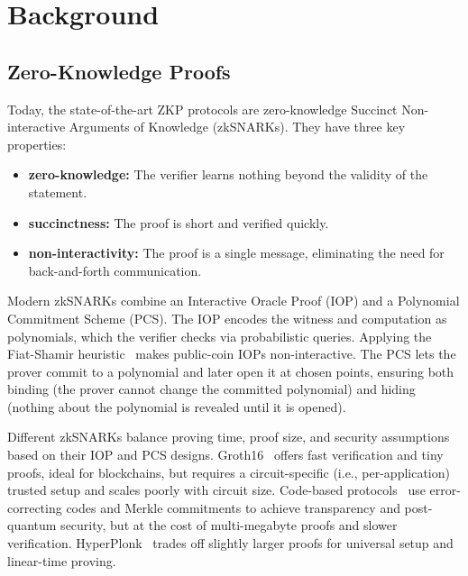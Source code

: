 \section{Background}
\label{sec:Background}

\subsection{Zero-Knowledge Proofs}
Today, the state-of-the-art ZKP protocols are zero-knowledge Succinct Non-interactive Arguments of Knowledge (zkSNARKs). They have three key properties:
\begin{itemize}
    \item {\textbf{zero-knowledge:}} The verifier learns nothing beyond the validity of the statement.
    \item {\textbf{succinctness:}} The proof is short and verified quickly.
    \item {\textbf{non-interactivity:}} The proof is a single message, eliminating the need for back-and-forth communication.
\end{itemize}

Modern zkSNARKs combine an Interactive Oracle Proof (IOP) and a Polynomial Commitment Scheme (PCS). The IOP encodes the witness and computation as polynomials, which the verifier checks via probabilistic queries. Applying the Fiat-Shamir heuristic~\cite{fiat_shamir} makes public-coin IOPs non-interactive. The PCS lets the prover commit to a polynomial and later open it at chosen points, ensuring both binding (the prover cannot change the committed polynomial) and hiding (nothing about the polynomial is revealed until it is opened).

Different zkSNARKs balance proving time, proof size, and security assumptions based on their IOP and PCS designs. Groth16~\cite{groth16} offers fast verification and tiny proofs, ideal for blockchains, but requires a circuit-specific (i.e., per-application) trusted setup and scales poorly with circuit size. Code-based protocols~\cite{orion} use error-correcting codes and Merkle commitments to achieve transparency and post-quantum security, but at the cost of multi-megabyte proofs and slower verification. HyperPlonk~\cite{hyperplonk} trades off slightly larger proofs for universal setup and linear-time proving.


